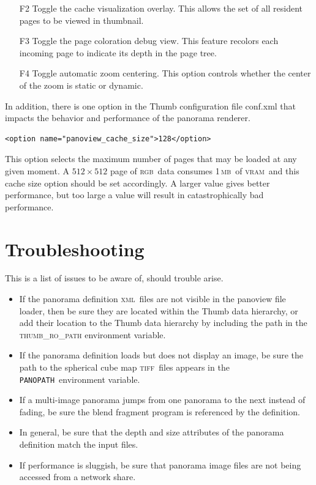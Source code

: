 \documentclass[oneside,11pt]{memoir}
\newcommand{\tiff}    {\textsc{tiff}}
\newcommand{\xml}     {\textsc{xml}}
\newcommand{\panopath}{\texttt{PANOPATH}}
\newcommand{\rgb}     {\textsc{rgb}}
\newcommand{\mb}    {\,\textsc{mb}}
\newcommand{\vram}    {\textsc{vram}}
\begin{document}
\begin{Spacing}{1.1}
\begin{itemize}
\item[F2] Toggle the cache visualization overlay. This allows the set of all resident pages to be viewed in thumbnail.

\item[F3] Toggle the page coloration debug view. This feature recolors each incoming page to indicate its depth in the page tree.

\item[F4] Toggle automatic zoom centering. This option controls whether the center of the zoom is static or dynamic.
\end{itemize}

In addition, there is one option in the Thumb configuration file conf.xml that impacts the behavior and performance of the panorama renderer.


\begin{verbatim}
<option name="panoview_cache_size">128</option>
\end{verbatim}

This option selects the maximum number of pages that may be loaded at any given moment. A $512\times 512$ page of \rgb\ data consumes 1\mb\ of \vram\, and this cache size option should be set accordingly. A larger value gives better performance, but too large a value will result in catastrophically bad performance.

\section{Troubleshooting}

This is a list of issues to be aware of, should trouble arise.

\begin{itemize}
\item If the panorama definition \xml\ files are not visible in the panoview file loader, then be sure they are located within the Thumb data hierarchy, or add their location to the Thumb data hierarchy by including the path in the \textsc{thumb\_ro\_path} environment variable.

\item If the panorama definition loads but does not display an image, be sure the path to the spherical cube map \tiff\ files appears in the \panopath\ environment variable.

\item If a multi-image panorama jumps from one panorama to the next instead of fading, be sure the blend fragment program is referenced by the definition.

\item In general, be sure that the depth and size attributes of the panorama definition match the input files.

\item If performance is sluggish, be sure that panorama image files are not being accessed from a network share.
\end{itemize}

\printpagenotes
\end{Spacing}
\end{document}
